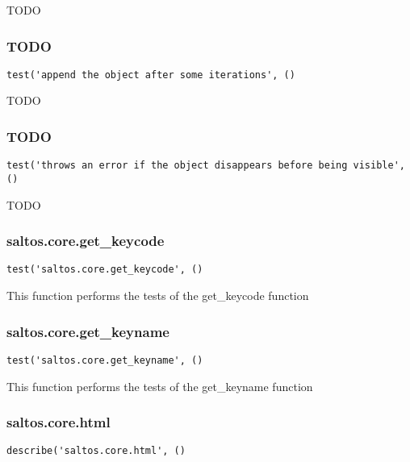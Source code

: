 \documentclass[a4paper]{article}
\begin{document}
TODO

\hypertarget{toc500}{}
\subsubsection{TODO}

\begin{lstlisting}
test('append the object after some iterations', ()
\end{lstlisting}

TODO

\hypertarget{toc501}{}
\subsubsection{TODO}

\begin{lstlisting}
test('throws an error if the object disappears before being visible', ()
\end{lstlisting}

TODO

\hypertarget{toc502}{}
\subsubsection{saltos.core.get\_keycode}

\begin{lstlisting}
test('saltos.core.get_keycode', ()
\end{lstlisting}

This function performs the tests of the get\_keycode function

\hypertarget{toc503}{}
\subsubsection{saltos.core.get\_keyname}

\begin{lstlisting}
test('saltos.core.get_keyname', ()
\end{lstlisting}

This function performs the tests of the get\_keyname function

\hypertarget{toc504}{}
\subsubsection{saltos.core.html}

\begin{lstlisting}
describe('saltos.core.html', ()
\end{lstlisting}
\end{document}
